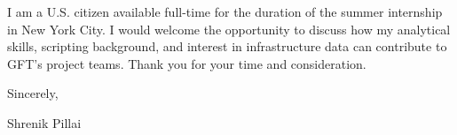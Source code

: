 \documentclass[11pt,letterpaper]{article}
\begin{document}
I am a U.S. citizen available full-time for the duration of the summer internship in New York City. I would welcome the opportunity to discuss how my analytical skills, scripting background, and interest in infrastructure data can contribute to GFT's project teams. Thank you for your time and consideration.

\vspace{10pt}

Sincerely,

Shrenik Pillai
\end{document}
